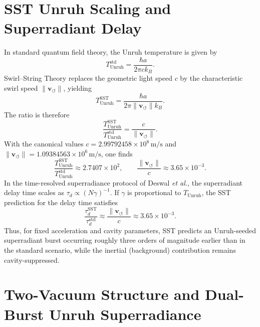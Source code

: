 \documentclass[10pt,reprint,aps,onecolumn,nofootinbib]{revtex4-2}
\newcommand{\vswirl}{\mathbf{v}_{\!\boldsymbol{\circlearrowleft}}}
\begin{document}
    \section{SST Unruh Scaling and Superradiant Delay}

    In standard quantum field theory, the Unruh temperature is given by
    \begin{equation}
        T_{\text{Unruh}}^{\text{std}} =
        \frac{\hbar a}{2\pi c k_B}.
    \end{equation}
    Swirl--String Theory replaces the geometric light speed $c$ by the
    characteristic swirl speed $\lVert\vswirl\rVert$, yielding
    \begin{equation}
        T_{\text{Unruh}}^{\text{SST}} =
        \frac{\hbar a}{2\pi \lVert\vswirl\rVert k_B}.
    \end{equation}
    The ratio is therefore
    \begin{equation}
        \frac{T_{\text{Unruh}}^{\text{SST}}}{T_{\text{Unruh}}^{\text{std}}}
        = \frac{c}{\lVert\vswirl\rVert}.
    \end{equation}
    With the canonical values $c = 2.99792458\times 10^{8}\,\mathrm{m/s}$
    and $\lVert\vswirl\rVert = 1.09384563\times 10^{6}\,\mathrm{m/s}$, one finds
    \begin{equation}
        \frac{T_{\text{Unruh}}^{\text{SST}}}{T_{\text{Unruh}}^{\text{std}}}
        \approx 2.7407\times 10^{2},
        \qquad
        \frac{\lVert\vswirl\rVert}{c} \approx 3.65\times 10^{-3}.
    \end{equation}
    In the time-resolved superradiance protocol of Deswal \emph{et al.},
    the superradiant delay time scales as $\tau_d \propto (N\gamma)^{-1}$.
    If $\gamma$ is proportional to $T_{\text{Unruh}}$, the SST prediction
    for the delay time satisfies
    \begin{equation}
        \frac{\tau_d^{\text{SST}}}{\tau_d^{\text{std}}}
        \approx \frac{\lVert\vswirl\rVert}{c}
        \approx 3.65\times 10^{-3}.
    \end{equation}
    Thus, for fixed acceleration and cavity parameters, SST predicts an
    Unruh-seeded superradiant burst occurring roughly three orders of
    magnitude earlier than in the standard scenario, while the inertial
    (background) contribution remains cavity-suppressed.

    \section{Two-Vacuum Structure and Dual-Burst Unruh Superradiance}
    \label{sec:sst_two_vacua_unruh}
\end{document}
